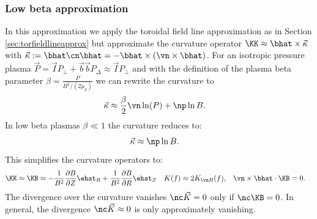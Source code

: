 \subsubsection{Low beta approximation}\label{sec:lowbetaapprox}
In this approximation we apply the toroidal field line approximation
as in Section
\ref{sec:torfieldlineapprox}
but approximate the curvature operator $ \KK \approx \bhat\times\vec \kappa$
  with
  $\vec \kappa := \bhat \cn\bhat = -\bhat \times( \vn\times \bhat)$.
For an isotropic pressure plasma \(\vec{P} = \vec{I} P_\perp + \vec{b} \vec{b} P_\Delta \approx \vec{I} P_\perp\) and with the definition of the plasma beta parameter
\(\beta = \frac{P}{B^2/(2 \mu_0) } \)
we can rewrite the curvature to
\begin{align}
    \vec{\kappa} &\approx \frac{\beta}{2} \vn \ln(P) +\np \ln{B} .
\end{align}
In low beta plasmas \(\beta\ll1\) the curvature reduces to:
\begin{align}
    \vec{\kappa} & \approx \np \ln{B} .
\end{align}
This simplifies the curvature operators to:
\begin{align}
\KK \approx \KB
  &\approx  -\frac{1}{B^2}\frac{\partial B}{\partial Z}\ehat_R +\frac{1}{B^2} \frac{\partial B}{\partial R}\ehat_Z &
{K} (f) &\approx 2{K}_{\vn  B} (f) , &
    \vn\times\bhat \cdot \KB &= 0.
\end{align}
The divergence over the curvature vanishes \( \nc \vec{ {K} } = 0\) only if \( \nc \KB   = 0\).
In general, the divergence \( \nc \vec{ {K} } \approx 0\) is only approximately vanishing.

